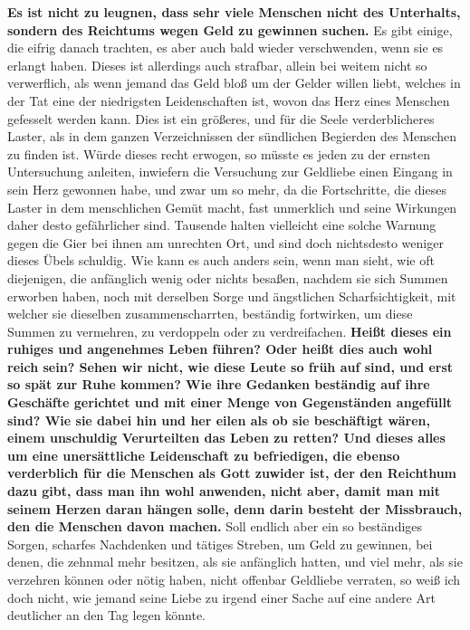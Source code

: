 \medskip

\textbf{Es ist nicht zu leugnen, dass sehr viele Menschen nicht des Unterhalts,
sondern
des Reichtums wegen Geld zu gewinnen suchen.} Es gibt einige, die eifrig
danach trachten, es aber auch bald wieder verschwenden,
wenn sie es erlangt
haben. Dieses ist allerdings auch strafbar, allein bei weitem nicht so
verwerflich, als wenn jemand das Geld bloß um der Gelder willen liebt, welches
in der Tat eine der niedrigsten Leidenschaften
ist, wovon das Herz eines
Menschen gefesselt werden kann. Dies ist ein größeres, und für die Seele
verderblicheres Laster, als in dem ganzen Verzeichnissen der sündlichen
Begierden des Menschen zu finden ist. Würde dieses recht erwogen, so müsste es
jeden zu der ernsten Untersuchung anleiten, inwiefern die Versuchung zur
Geldliebe einen Eingang in sein Herz gewonnen habe, und zwar um so mehr, da die
Fortschritte, die dieses Laster in dem menschlichen Gemüt macht, fast
unmerklich und seine Wirkungen daher desto gefährlicher sind. Tausende halten
vielleicht eine solche Warnung gegen die Gier bei ihnen am unrechten Ort, und
sind doch nichtsdesto weniger dieses Übels schuldig. Wie kann es auch anders
sein, wenn man sieht, wie oft diejenigen, die anfänglich wenig oder nichts
besaßen, nachdem sie sich Summen erworben haben, noch mit derselben Sorge und
ängstlichen Scharfsichtigkeit, mit welcher sie dieselben zusammenscharrten,
beständig fortwirken, um diese Summen zu vermehren, zu verdoppeln oder zu
verdreifachen. \textbf{Heißt dieses ein ruhiges und angenehmes Leben führen?
Oder heißt
dies auch wohl reich sein? Sehen wir nicht, wie diese Leute so früh auf sind,
und erst so spät zur Ruhe kommen? Wie ihre Gedanken beständig auf ihre Geschäfte
gerichtet und mit einer Menge von Gegenständen angefüllt sind? Wie sie dabei hin
und her eilen als ob sie beschäftigt wären, einem unschuldig Verurteilten das
Leben zu retten? Und dieses alles um eine unersättliche Leidenschaft zu
befriedigen, die ebenso verderblich für die Menschen als Gott zuwider ist, der
den Reichthum dazu gibt, dass man ihn wohl anwenden, nicht aber, damit man mit
seinem Herzen daran hängen solle, denn darin besteht der Missbrauch, den die
Menschen davon machen.} Soll endlich aber ein so beständiges Sorgen, scharfes
Nachdenken und tätiges Streben, um Geld zu gewinnen, bei denen, die zehnmal
mehr besitzen, als sie anfänglich hatten, und viel mehr, als sie verzehren
können oder nötig haben, nicht offenbar Geldliebe verraten, so weiß ich doch
nicht, wie jemand seine Liebe zu irgend einer Sache auf eine andere Art
deutlicher an den Tag legen könnte.

